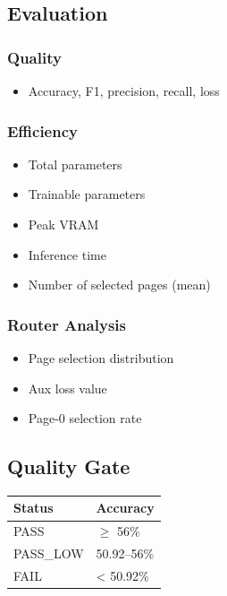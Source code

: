\subsection{Evaluation}

\subsubsection{Quality}
\begin{itemize}
\item Accuracy, F1, precision, recall, loss

\end{itemize}
\subsubsection{Efficiency}
\begin{itemize}
\item Total parameters
\item Trainable parameters
\item Peak VRAM
\item Inference time
\item Number of selected pages (mean)

\end{itemize}
\subsubsection{Router Analysis}
\begin{itemize}
\item Page selection distribution
\item Aux loss value
\item Page-0 selection rate

\end{itemize}
\subsection{Quality Gate}

\begin{table}[H]
\centering
\small
\begin{tabular}{ll}
\toprule
\textbf{Status} & \textbf{Accuracy} \\
\midrule
PASS & $\ge$ 56\% \\
PASS\_LOW & 50.92--56\% \\
FAIL & \textless{} 50.92\% \\
\bottomrule
\end{tabular}
\end{table}

